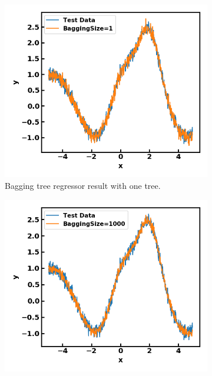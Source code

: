 \begin{refsection}
\begin{figure}[H]
	\centering	
	\begin{subfigure}[b]{0.42\textwidth}
		\centering
		\includegraphics[width=1\linewidth]{../figures/statisticalLearning/treeMethods/BaggingTreeRegressorExampleOneTree}
		\caption{Bagging tree regressor result with one tree.}
	\end{subfigure}\quad
\begin{subfigure}[b]{0.42\textwidth}
	\centering
	\includegraphics[width=1\linewidth]{../figures/statisticalLearning/treeMethods/BaggingTreeRegressorExampleOneThousandTrees}

\end{subfigure}
\end{figure}
\end{refsection}
